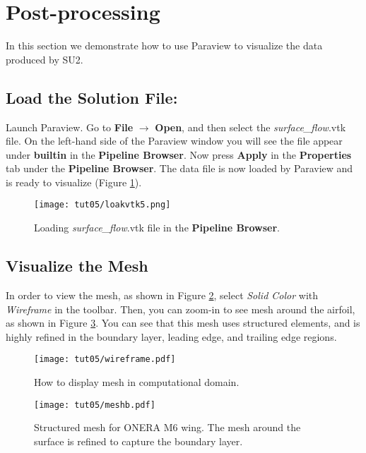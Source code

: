 \section{Post-processing}
In this section we demonstrate how to use Paraview to visualize the data produced by SU2.
\subsection{Load the Solution File:}
Launch Paraview. Go to \textbf{File} $\rightarrow$ \textbf{Open}, and then select the \textit{surface\_flow}.vtk file. On the left-hand side of the Paraview window you will see the file appear under \textbf{builtin} in the \textbf{Pipeline Browser}. Now press \textbf{Apply} in the \textbf{Properties} tab under the  \textbf{Pipeline Browser}. The data file is now loaded by Paraview and is ready to visualize (Figure \ref{fig5:load}).
\begin{figure}[htbp]
    \centering
    \texttt{[image: tut05/loakvtk5.png]}
    \caption{Loading \textit{surface\_flow}.vtk file in the \textbf{Pipeline Browser}.}
    \label{fig5:load}
\end{figure}
\subsection{Visualize the Mesh}
In order to view the mesh, as shown in Figure \ref{fig5:wireframe}, select \textit{Solid Color} with \textit{Wireframe} in the toolbar. Then, you can zoom-in to see mesh around the airfoil, as shown in Figure \ref{fig5:mesh}. You can see that this mesh uses structured elements, and is highly refined in the boundary layer, leading edge, and trailing edge regions.
\begin{figure}[htbp]
    \centering
    \texttt{[image: tut05/wireframe.pdf]}
    \caption{How to display mesh in computational domain.}
    \label{fig5:wireframe}
\end{figure}
\begin{figure}[htbp]
    \centering
    \texttt{[image: tut05/meshb.pdf]}
    \caption{Structured mesh for ONERA M6 wing. The mesh around the surface is refined to capture the boundary layer.}
    \label{fig5:mesh}
\end{figure}
